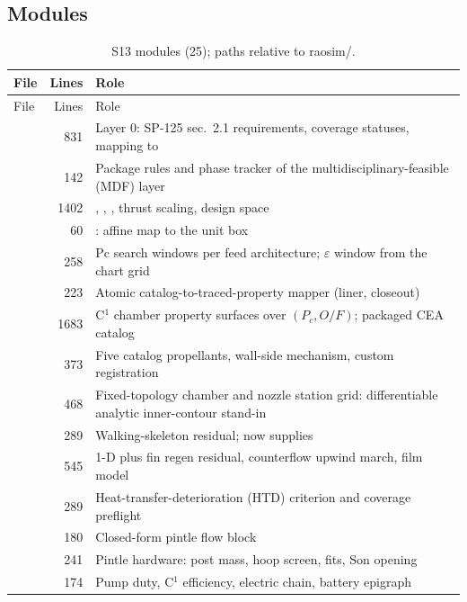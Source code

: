 \subsection{Modules}\label{sec:s13-modules}
{\small
\begin{longtable}{@{}P{3.6cm}r P{11.2cm}@{}}
\caption{S13 modules (25); paths relative to raosim/.}\label{tab:s13-modules}\\
\toprule
File & Lines & Role\\
\midrule\endfirsthead
\toprule File & Lines & Role\\ \midrule\endhead
{} & 831 & Layer 0: SP-125 sec.~2.1 requirements, coverage statuses, mapping to \\
 & 142 & Package rules and phase tracker of the multidisciplinary-feasible (MDF) layer\\
 & 1402 & , , , thrust scaling, design space\\
 & 60 & : affine map to the unit box\\
 & 258 & Pc search windows per feed architecture; $\varepsilon$ window from the chart grid\\
 & 223 & Atomic catalog-to-traced-property mapper (liner, closeout)\\
 & 1683 & C$^1$ chamber property surfaces over $(P_c,O/F)$; packaged CEA catalog\\
 & 373 & Five catalog propellants, wall-side mechanism, custom registration\\
 & 468 & Fixed-topology chamber and nozzle station grid: differentiable analytic inner-contour stand-in\\
 & 289 & Walking-skeleton residual; now supplies \\
 & 545 & 1-D plus fin regen residual, counterflow upwind march, film model\\
 & 289 & Heat-transfer-deterioration (HTD) criterion and coverage preflight\\
 & 180 & Closed-form pintle flow block\\
 & 241 & Pintle hardware: post mass, hoop screen, fits, Son opening\\
 & 174 & Pump duty, C$^1$ efficiency, electric chain, battery epigraph\\

\end{longtable}}
